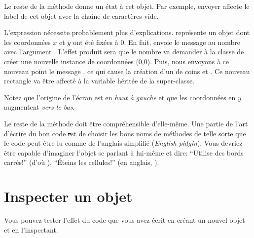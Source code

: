 \documentclass[a4paper,10pt,twoside]{book}
\begin{document}
Le reste de la méthode donne un état à cet objet.
Par exemple, envoyer  affecte le label de cet objet avec la chaîne de caractères vide.

L'expression  nécessite probablement plus d'explications.
 représente un objet  dont les coordonnées $x$ et $y$ ont été fixées à 0.
En fait,  envoie le message %
au nombre  avec l'argument .
L'effet produit sera que le nombre  va demander à la classe  de créer une nouvelle instance de coordonnées (0,0).
Puis, nous envoyons à ce nouveau point le message , ce qui cause la création d'un  de coins  et .
Ce nouveau rectangle va \^etre affecté à la variable  héritée de la super-classe.

Notez que l'origine de l'écran \pharo est en \emph{haut à gauche} et que les coordonnées en $y$ augmentent \emph{vers le bas}.

Le reste de la méthode doit \^etre compréhensible d'elle-m\^eme.
Une partie de l'art d'écrire du bon code \st est de choisir les bons
noms de méthodes de telle sorte que le code \st peut \^etre lu comme
de l'anglais simplifié (\emph{English pidgin}).  
Vous devriez \^etre capable d'imaginer l'objet se parlant à lui-m\^eme et
dire:  ``Utilise des bords carrés!'' (d'o\`u ),
``Éteins les cellules!'' (en anglais, ).

\section{Inspecter un objet}

Vous pouvez tester l'effet du code que vous avez écrit en créant un nouvel objet  et en l'inspectant.
\end{document}
